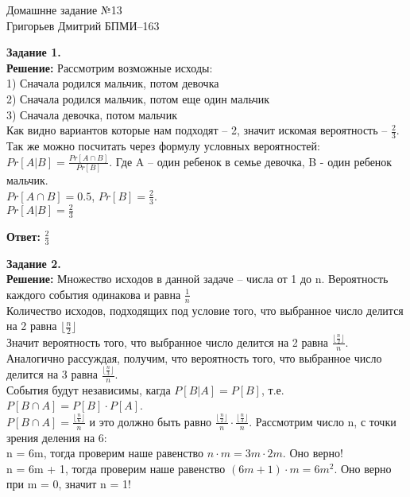 \documentclass[12pt,a4paper]{scrartcl}
\begin{document}
	\begin{center}	
		Домашнне задание №13 \\
		Григорьев Дмитрий БПМИ--163
	\end{center}
	\textbf{Задание 1.} \\
	\textbf{Решение:}
		Рассмотрим возможные исходы:\\
		1) Сначала родился мальчик, потом девочка\\
		2) Сначала родился мальчик, потом еще один мальчик\\
		3) Сначала девочка, потом мальчик\\
		Как видно вариантов которые нам подходят -- 2, значит искомая вероятность --
		$\frac{2}{3}$.\\
		Так же можно посчитать через формулу условных вероятностей: $Pr[A|B] = \frac{Pr[A \cap B]}{Pr[B]}$. Где A -- один ребенок в семье девочка, B - один ребенок мальчик. \\
		$Pr[A \cap B] = 0.5$, $Pr[B] = \frac{2}{3}$.\\
		$Pr[A|B] = \frac{2}{3}$
	\begin{flushright}	
		\textbf{Ответ:} $\frac{2}{3}$
	\end{flushright} 
	\textbf{Задание 2.}\\
	\textbf{Решение:}
		Множество исходов в данной задаче  -- числа от 1 до n. Вероятность каждого события одинакова и равна $\frac{1}{n}$\\
		Количество исходов, подходящих под условие того, что выбранное число делится на 2 равна $\lfloor \frac{n}{2} \rfloor$ \\
		Значит вероятность того, что выбранное число делится на 2 равна $\frac{\lfloor \frac{n}{2} \rfloor}{n}$. \\
		Аналогично рассуждая, получим, что вероятность того, что выбранное число делится на 3 равна $\frac{\lfloor \frac{n}{3} \rfloor}{n}$.\\
		События будут независимы, кагда $P[B|A] = P[B]$, т.е.
		$P[B \cap A] = P[B] \cdot P[A]$.\\
		$P[B \cap A] = \frac{\lfloor \frac{n}{6} \rfloor}{n}$ и это должно быть равно $\frac{\lfloor \frac{n}{2} \rfloor}{n} \cdot \frac{\lfloor \frac{n}{3} \rfloor}{n}$.
		Рассмотрим число n, с точки зрения деления на 6:\\
		n = 6m, тогда проверим наше равенство $n \cdot m = 3m \cdot 2m$. Оно верно! \\
		n = 6m + 1, тогда проверим наше равенство $(6m + 1) \cdot m = 6m^2$. Оно верно при m = 0, значит n = 1! \\
\end{document}
